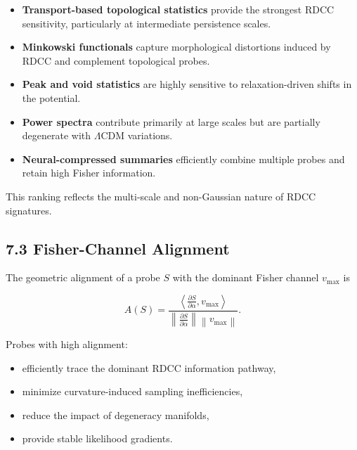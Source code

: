 \documentclass[11pt,a4paper]{article}
\begin{document}
\begin{itemize}
    \item \textbf{Transport-based topological statistics} provide the strongest 
    RDCC sensitivity, particularly at intermediate persistence scales.

    \item \textbf{Minkowski functionals} capture morphological distortions 
    induced by RDCC and complement topological probes.

    \item \textbf{Peak and void statistics} are highly sensitive to 
    relaxation-driven shifts in the potential.

    \item \textbf{Power spectra} contribute primarily at large scales but are 
    partially degenerate with $\Lambda$CDM variations.

    \item \textbf{Neural-compressed summaries} efficiently combine multiple 
    probes and retain high Fisher information.
\end{itemize}

This ranking reflects the multi-scale and non-Gaussian nature of RDCC 
signatures.

\subsection*{7.3 Fisher-Channel Alignment}

The geometric alignment of a probe $S$ with the dominant Fisher channel 
$v_{\mathrm{max}}$ is


\[
    A(S)
    =
    \frac{
        \left\langle
            \frac{\partial S}{\partial \alpha},
            v_{\mathrm{max}}
        \right\rangle
    }{
        \left\|
            \frac{\partial S}{\partial \alpha}
        \right\|
        \left\|
            v_{\mathrm{max}}
        \right\|
    }.
\]



Probes with high alignment:

\begin{itemize}
    \item efficiently trace the dominant RDCC information pathway,
    \item minimize curvature-induced sampling inefficiencies,
    \item reduce the impact of degeneracy manifolds,
    \item provide stable likelihood gradients.
\end{itemize}
\end{document}
